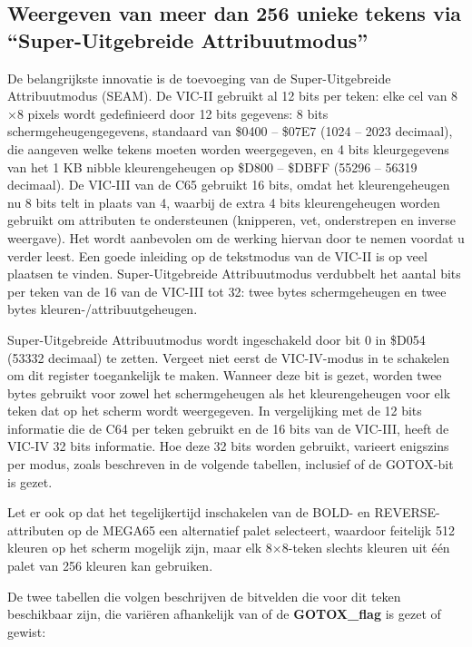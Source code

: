 \subsection{Weergeven van meer dan 256 unieke tekens via ``Super-Uitgebreide Attribuutmodus''}

De belangrijkste innovatie is de toevoeging van de Super-Uitgebreide Attribuutmodus (SEAM). De VIC-II gebruikt al 12 bits per teken: elke cel van 8$\times$8 pixels wordt gedefinieerd door 12 bits gegevens: 8 bits schermgeheugengegevens, standaard van \$0400 -- \$07E7 (1024 -- 2023 decimaal), die aangeven welke tekens moeten worden weergegeven, en 4 bits kleurgegevens van het 1 KB nibble kleurengeheugen op \$D800 -- \$DBFF (55296 -- 56319 decimaal). De VIC-III van de C65 gebruikt 16 bits, omdat het kleurengeheugen nu 8 bits telt in plaats van 4, waarbij de extra 4 bits kleurengeheugen worden gebruikt om attributen te ondersteunen (knipperen, vet, onderstrepen en inverse weergave). Het wordt aanbevolen om de werking hiervan door te nemen voordat u verder leest. Een goede inleiding op de tekstmodus van de VIC-II is op veel plaatsen te vinden.
Super-Uitgebreide Attribuutmodus verdubbelt het aantal bits per teken van de 16 van de VIC-III tot 32: twee bytes schermgeheugen en twee bytes kleuren-/attribuutgeheugen.

Super-Uitgebreide Attribuutmodus wordt ingeschakeld door bit 0 in \$D054 (53332 decimaal) te zetten. Vergeet niet eerst de VIC-IV-modus in te schakelen om dit register toegankelijk te maken. Wanneer deze bit is gezet, worden twee bytes gebruikt voor zowel het schermgeheugen als het kleurengeheugen voor elk teken dat op het scherm wordt weergegeven. In vergelijking met de 12 bits informatie die de C64 per teken gebruikt en de 16 bits van de VIC-III, heeft de VIC-IV 32 bits informatie. Hoe deze 32 bits worden gebruikt, varieert enigszins per modus, zoals beschreven in de volgende tabellen, inclusief of de GOTOX-bit is gezet.

Let er ook op dat het tegelijkertijd inschakelen van de BOLD- en REVERSE-attributen op de MEGA65 een alternatief palet selecteert, waardoor feitelijk 512 kleuren op het scherm mogelijk zijn, maar elk 8$\times$8-teken slechts kleuren uit één palet van 256 kleuren kan gebruiken.

De twee tabellen die volgen beschrijven de bitvelden die voor dit teken beschikbaar zijn, die variëren afhankelijk van of de \textbf{GOTOX\_flag} is gezet of gewist:

